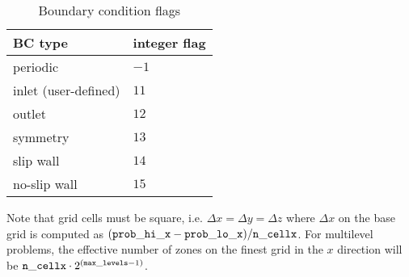 \begin{itemize}
   \begin{table}[h]
   \caption{\label{arch:table:bcflags} Boundary condition flags}  
   \begin{center}
   \begin{tabular}{ll}
   \hline
   BC type    & integer flag \\
   \hline
   periodic             & $-1$ \\
   inlet (user-defined) & $11$ \\
   outlet               & $12$ \\
   symmetry             & $13$ \\
   slip wall            & $14$ \\
   no-slip wall         & $15$ \\
   \hline
   \end{tabular}
   \end{center}
   \end{table}

\end{itemize}

Note that grid cells must be square, i.e. $\Delta x = \Delta y = \Delta z$
where $\Delta x$ on the base grid is computed as $({\tt prob\_hi\_x}
- {\tt prob\_lo\_x})/{\tt n\_cellx}$.  For multilevel problems, the effective
number of zones on the finest grid in the $x$ direction will be
${\tt n\_cellx} \cdot 2^{({\tt max\_levels} -1)}$.



